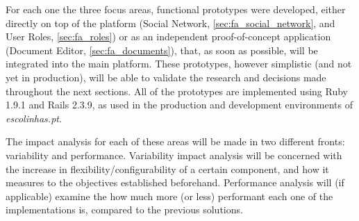 For each one the three focus areas, functional prototypes were developed, either directly on top of the platform (Social Network, \ref{sec:fa_social_network}, and User Roles, \ref{sec:fa_roles}) or as an independent proof-of-concept application (Document Editor, \ref{sec:fa_documents}), that, as soon as possible, will be integrated into the main platform. These prototypes, however simplistic (and not yet in production), will be able to validate the research and decisions made throughout the next sections. All of the prototypes are implemented using Ruby 1.9.1 and Rails 2.3.9, as used in the production and development environments of \emph{escolinhas.pt}.

The impact analysis for each of these areas will be made in two different fronts: variability and performance. Variability impact analysis will be concerned with the increase in flexibility/configurability of a certain component, and how it measures to the objectives established beforehand. Performance analysis will (if applicable) examine the how much more (or less) performant each one of the implementations is, compared to the previous solutions.




